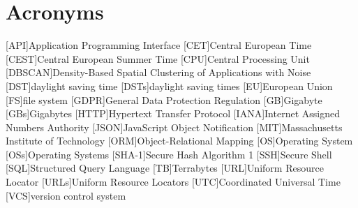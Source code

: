 \chapter*{Acronyms}
\begin{acronym}
    [API]{Application Programming Interface}
    [CET]{Central European Time}
    [CEST]{Central European Summer Time}
    [CPU]{Central Processing Unit}
    [DBSCAN]{Density-Based Spatial Clustering of Applications with Noise}
    [DST]{daylight saving time}
    [DSTs]{daylight saving times}
    [EU]{European Union}
    [FS]{file system}
    [GDPR]{General Data Protection Regulation}
    [GB]{Gigabyte}
    [GBs]{Gigabytes}
    [HTTP]{Hypertext Transfer Protocol}
    [IANA]{Internet Assigned Numbers Authority}
    [JSON]{JavaScript Object Notification}
    [MIT]{Massachusetts Institute of Technology}
    [ORM]{Object-Relational Mapping}
    [OS]{Operating System}
    [OSs]{Operating Systems}
    [SHA-1]{Secure Hash Algorithm 1}
    [SSH]{Secure Shell}
    [SQL]{Structured Query Language}
    [TB]{Terrabytes}
    [URL]{Uniform Resource Locator}
    [URLs]{Uniform Resource Locators}
    [UTC]{Coordinated Universal Time}
    [VCS]{version control system}
\end{acronym}

